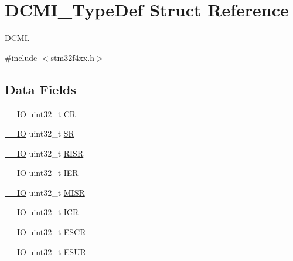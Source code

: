 \hypertarget{struct_d_c_m_i___type_def}{}\section{D\+C\+M\+I\+\_\+\+Type\+Def Struct Reference}
\label{struct_d_c_m_i___type_def}


D\+C\+MI.  




{\ttfamily \#include $<$stm32f4xx.\+h$>$}

\subsection*{Data Fields}
\begin{DoxyCompactItemize}
\item 
\hyperlink{group___c_m_s_i_s__core__definitions_gaec43007d9998a0a0e01faede4133d6be}{\+\_\+\+\_\+\+IO} uint32\+\_\+t \hyperlink{struct_d_c_m_i___type_def_ab40c89c59391aaa9d9a8ec011dd0907a}{CR}
\item 
\hyperlink{group___c_m_s_i_s__core__definitions_gaec43007d9998a0a0e01faede4133d6be}{\+\_\+\+\_\+\+IO} uint32\+\_\+t \hyperlink{struct_d_c_m_i___type_def_af6aca2bbd40c0fb6df7c3aebe224a360}{SR}
\item 
\hyperlink{group___c_m_s_i_s__core__definitions_gaec43007d9998a0a0e01faede4133d6be}{\+\_\+\+\_\+\+IO} uint32\+\_\+t \hyperlink{struct_d_c_m_i___type_def_aa196fddf0ba7d6e3ce29bdb04eb38b94}{R\+I\+SR}
\item 
\hyperlink{group___c_m_s_i_s__core__definitions_gaec43007d9998a0a0e01faede4133d6be}{\+\_\+\+\_\+\+IO} uint32\+\_\+t \hyperlink{struct_d_c_m_i___type_def_a6566f8cfbd1d8aa7e8db046aa35e77db}{I\+ER}
\item 
\hyperlink{group___c_m_s_i_s__core__definitions_gaec43007d9998a0a0e01faede4133d6be}{\+\_\+\+\_\+\+IO} uint32\+\_\+t \hyperlink{struct_d_c_m_i___type_def_a524e134cec519206cb41d0545e382978}{M\+I\+SR}
\item 
\hyperlink{group___c_m_s_i_s__core__definitions_gaec43007d9998a0a0e01faede4133d6be}{\+\_\+\+\_\+\+IO} uint32\+\_\+t \hyperlink{struct_d_c_m_i___type_def_a0a8c8230846fd8ff154b9fde8dfa0399}{I\+CR}
\item 
\hyperlink{group___c_m_s_i_s__core__definitions_gaec43007d9998a0a0e01faede4133d6be}{\+\_\+\+\_\+\+IO} uint32\+\_\+t \hyperlink{struct_d_c_m_i___type_def_a9cc4ec74be864c929261e0810f2fd7f0}{E\+S\+CR}
\item 
\hyperlink{group___c_m_s_i_s__core__definitions_gaec43007d9998a0a0e01faede4133d6be}{\+\_\+\+\_\+\+IO} uint32\+\_\+t \hyperlink{struct_d_c_m_i___type_def_af751d49ef824c1636c78822ecae066f4}{E\+S\+UR}

\end{DoxyCompactItemize}
